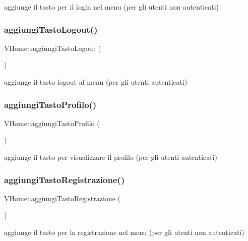 aggiunge il tasto per il login nel menu (per gli utenti non autenticati) \mbox{\label{class_v_home_a4623e9c0d8aef960ba5bb9c61bfe97da}} 
\subsubsection{\texorpdfstring{aggiungi\+Tasto\+Logout()}{aggiungiTastoLogout()}}
{\footnotesize\ttfamily V\+Home\+::aggiungi\+Tasto\+Logout (\begin{DoxyParamCaption}{ }\end{DoxyParamCaption})}

aggiunge il tasto logout al menu (per gli utenti autenticati) \mbox{\label{class_v_home_afe8dd3a6b2fc94f88bc08424f35c678e}} 
\subsubsection{\texorpdfstring{aggiungi\+Tasto\+Profilo()}{aggiungiTastoProfilo()}}
{\footnotesize\ttfamily V\+Home\+::aggiungi\+Tasto\+Profilo (\begin{DoxyParamCaption}{ }\end{DoxyParamCaption})}

aggiunge il tasto per visualizzare il profilo (per gli utenti autenticati) \mbox{\label{class_v_home_a05532f14a1f2d0d974c1dc10d7a20754}} 
\subsubsection{\texorpdfstring{aggiungi\+Tasto\+Registrazione()}{aggiungiTastoRegistrazione()}}
{\footnotesize\ttfamily V\+Home\+::aggiungi\+Tasto\+Registrazione (\begin{DoxyParamCaption}{ }\end{DoxyParamCaption})}

aggiunge il tasto per la registrazione nel menu (per gli utenti non autenticati) \mbox{\label{class_v_home_a4ca8c85ed6df3d7b40594e257b5cd50c}} 
